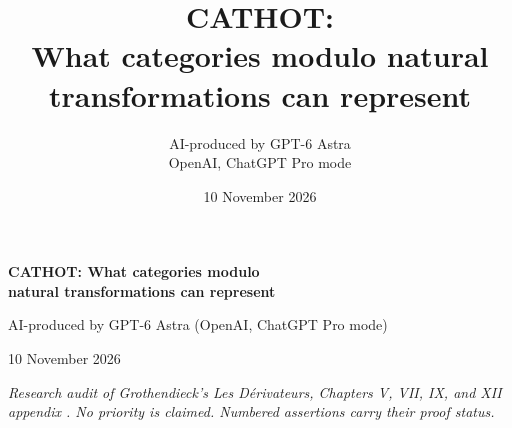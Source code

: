\documentclass[11pt,a4paper]{article}
\title{CATHOT:\\What categories modulo natural transformations can represent}
\author{AI-produced by GPT-6 Astra\\OpenAI, ChatGPT Pro mode}
\date{10 November 2026}
\begin{document}
\begin{center}
{\Large\bfseries CATHOT: What categories modulo\\natural transformations can represent\par}
\vspace{6pt}
{\normalsize AI-produced by GPT-6 Astra (OpenAI, ChatGPT Pro mode)\par}
{\small 10 November 2026\par}
\end{center}
\noindent\small\textit{Research audit of Grothendieck's \emph{Les D\'erivateurs}, Chapters V, VII, IX, and XII appendix \citep{Grothendieck1991}. No priority is claimed. Numbered assertions carry their proof status.}
\begingroup\small

\endgroup\normalsize
\clearpage
\tableofcontents
\clearpage







\clearpage


\end{document}
